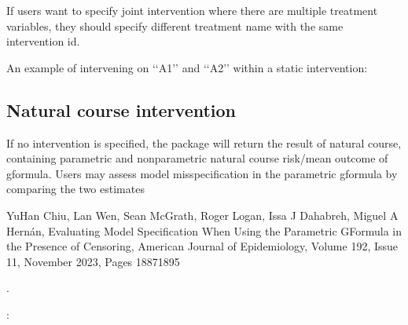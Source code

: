 \documentclass[letterpaper,10pt,english]{sphinxmanual}
\begin{document}
\sphinxAtStartPar
If users want to specify joint intervention where there are multiple treatment variables,
they should specify different treatment name with the same intervention id.

\sphinxAtStartPar
An example of intervening on ‘‘A1’’ and ‘‘A2’’ within a static intervention:

\begin{sphinxVerbatim}[commandchars=\\\{\}]
  \PYG{p}{[} \PYG{p}{]}
  \PYG{p}{[} \PYG{p}{]}
\end{sphinxVerbatim}


\subsection{Natural course intervention}
\label{\detokenize{Specifications/Intervention:natural-course-intervention}}
\sphinxAtStartPar
If no intervention is specified, the package will return the result of natural course, containing
parametric and nonparametric natural course risk/mean outcome of g\sphinxhyphen{}formula. Users may assess model misspecification in
the parametric g\sphinxhyphen{}formula by comparing the two estimates \sphinxstepexplicit %
\begin{footnote}[3]\label{\thesphinxscope.3}%
\sphinxAtStartFootnote
Yu\sphinxhyphen{}Han Chiu, Lan Wen, Sean McGrath, Roger Logan, Issa J Dahabreh, Miguel A Hernán, Evaluating Model Specification
When Using the Parametric G\sphinxhyphen{}Formula in the Presence of Censoring, American Journal of Epidemiology, Volume 192, Issue 11, November 2023, Pages 1887\textendash{}1895
%
\end{footnote}.

\sphinxAtStartPar
{} :
\end{document}
